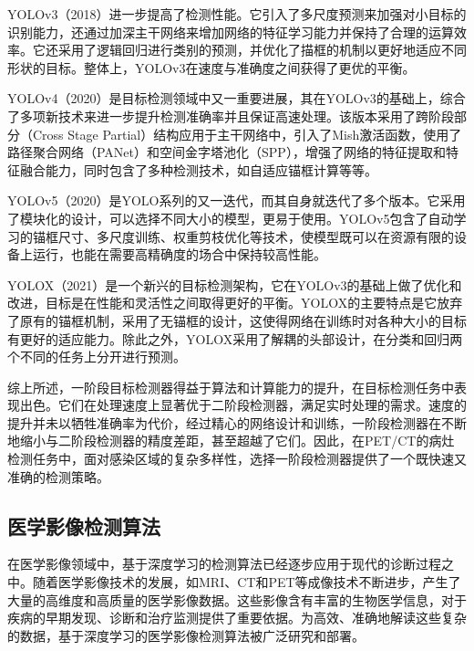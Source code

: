 YOLOv3\cite{redmon2018yolov3}（2018）进一步提高了检测性能。它引入了多尺度预测来加强对小目标的识别能力，还通过加深主干网络来增加网络的特征学习能力并保持了合理的运算效率。它还采用了逻辑回归进行类别的预测，并优化了描框的机制以更好地适应不同形状的目标。整体上，YOLOv3在速度与准确度之间获得了更优的平衡。

YOLOv4\cite{bochkovskiy2020yolov4}（2020）是目标检测领域中又一重要进展，其在YOLOv3\cite{redmon2018yolov3}的基础上，综合了多项新技术来进一步提升检测准确率并且保证高速处理。该版本采用了跨阶段部分（Cross Stage Partial）\cite{wang2020cspnet}结构应用于主干网络中，引入了Mish\cite{misra2019mish}激活函数，使用了路径聚合网络（PANet）\cite{liu2018path}和空间金字塔池化（SPP）\cite{he2015spatial}，增强了网络的特征提取和特征融合能力，同时包含了多种检测技术，如自适应锚框计算等等。

YOLOv5\cite{jocher2020yolov5}（2020）是YOLO系列的又一迭代，而其自身就迭代了多个版本。它采用了模块化的设计，可以选择不同大小的模型，更易于使用。YOLOv5包含了自动学习的锚框尺寸、多尺度训练、权重剪枝优化等技术，使模型既可以在资源有限的设备上运行，也能在需要高精确度的场合中保持较高性能。

YOLOX\cite{ge2021yolox}（2021）是一个新兴的目标检测架构，它在YOLOv3的基础上做了优化和改进，目标是在性能和灵活性之间取得更好的平衡。YOLOX的主要特点是它放弃了原有的锚框机制，采用了无锚框的设计，这使得网络在训练时对各种大小的目标有更好的适应能力。除此之外，YOLOX采用了解耦的头部设计，在分类和回归两个不同的任务上分开进行预测。

综上所述，一阶段目标检测器得益于算法和计算能力的提升，在目标检测任务中表现出色。它们在处理速度上显著优于二阶段检测器，满足实时处理的需求。速度的提升并未以牺牲准确率为代价，经过精心的网络设计和训练，一阶段检测器在不断地缩小与二阶段检测器的精度差距，甚至超越了它们。因此，在PET/CT的病灶检测任务中，面对感染区域的复杂多样性，选择一阶段检测器提供了一个既快速又准确的检测策略。

\subsection{医学影像检测算法}

在医学影像领域中，基于深度学习的检测算法已经逐步应用于现代的诊断过程之中。随着医学影像技术的发展，如MRI、CT和PET等成像技术不断进步，产生了大量的高维度和高质量的医学影像数据。这些影像含有丰富的生物医学信息，对于疾病的早期发现、诊断和治疗监测提供了重要依据。为高效、准确地解读这些复杂的数据，基于深度学习的医学影像检测算法被广泛研究和部署。

